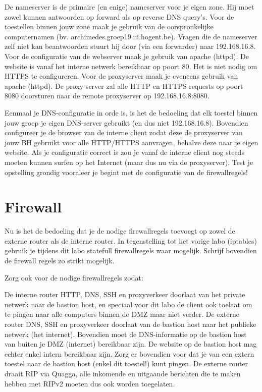 \documentclass{report}
\begin{document}
    De nameserver is de primaire (en enige) nameserver voor je eigen zone.
    Hij moet zowel kunnen antwoorden op forward als op reverse DNS query's.
    Voor de toestellen binnen jouw zone maak je gebruik van de oorspronkelijke computernamen (bv. archimedes.groep19.iii.hogent.be).
    Vragen die de nameserver zelf niet kan beantwoorden stuurt hij door (via een forwarder) naar 192.168.16.8.
    Voor de configuratie van de webserver maak je gebruik van apache (httpd).
    De website is vanaf het interne netwerk bereikbaar op poort 80.
    Het is niet nodig om HTTPS te configureren.
    Voor de proxyserver maak je eveneens gebruik van apache (httpd).
    De proxy-server zal alle HTTP en HTTPS requests op poort 8080 doorsturen naar de remote proxyserver op 192.168.16.8:8080.

Eenmaal je DNS-configuratie in orde is, is het de bedoeling dat elk toestel binnen jouw groep je eigen DNS-server gebruikt (en dus niet 192.168.16.8).
Bovendien configureer je de browser van de interne client zodat deze de proxyserver van jouw BH gebruikt voor alle HTTP/HTTPS aanvragen, behalve deze naar je eigen website.
Als je configuratie correct is zou je vanaf de interne client nog steeds moeten kunnen surfen op het Internet (maar dus nu via de proxyserver).
Test je opstelling grondig vooraleer je begint met de configuratie van de firewallregels!
\section{Firewall}

Nu is het de bedoeling dat je de nodige firewallregels toevoegt op zowel de externe router als de interne router.
In tegenstelling tot het vorige labo (iptables) gebruik je tijdens dit labo statefull firewallregels waar mogelijk.
Schrijf bovendien de firewall regels zo strikt mogelijk.

Zorg ook voor de nodige firewallregels zodat:

    De interne router HTTP, DNS, SSH en proxyverkeer doorlaat van het private netwerk naar de bastion host, en speciaal voor dit labo de client ook toelaat om te pingen naar alle computers binnen de DMZ maar niet verder.
    De externe router DNS, SSH en proxyverkeer doorlaat van de bastion host naar het publieke netwerk (het internet).
    Bovendien moet de DNS-informatie op de bastion host van buiten je DMZ (internet) bereikbaar zijn.
    De website op de bastion host mag echter enkel intern bereikbaar zijn.
    Zorg er bovendien voor dat je van een extern toestel naar de bastion host (enkel dit toestel!) kunt pingen.
    De externe router draait RIP via Quagga, alle inkomende en uitgaande berichten die te maken hebben met RIPv2 moeten dus ook worden toegelaten.
\end{document}
